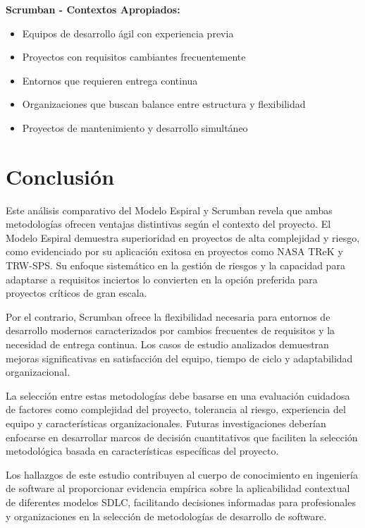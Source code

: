 \documentclass[conference]{IEEEtran}
\begin{document}
\textbf{Scrumban - Contextos Apropiados:}
\begin{itemize}
\item Equipos de desarrollo ágil con experiencia previa \cite{empirical_scrumban_2018}
\item Proyectos con requisitos cambiantes frecuentemente \cite{sixsigma_scrumban}
\item Entornos que requieren entrega continua \cite{atlassian_scrumban}
\item Organizaciones que buscan balance entre estructura y flexibilidad \cite{yilmaz_gamification_2016}
\item Proyectos de mantenimiento y desarrollo simultáneo \cite{scrumbanfall_2020}
\end{itemize}


\section{Conclusión}

Este análisis comparativo del Modelo Espiral y Scrumban revela que ambas metodologías ofrecen ventajas distintivas según el contexto del proyecto. El Modelo Espiral demuestra superioridad en proyectos de alta complejidad y riesgo, como evidenciado por su aplicación exitosa en proyectos como NASA TReK y TRW-SPS. Su enfoque sistemático en la gestión de riesgos y la capacidad para adaptarse a requisitos inciertos lo convierten en la opción preferida para proyectos críticos de gran escala.

Por el contrario, Scrumban ofrece la flexibilidad necesaria para entornos de desarrollo modernos caracterizados por cambios frecuentes de requisitos y la necesidad de entrega continua. Los casos de estudio analizados demuestran mejoras significativas en satisfacción del equipo, tiempo de ciclo y adaptabilidad organizacional.

La selección entre estas metodologías debe basarse en una evaluación cuidadosa de factores como complejidad del proyecto, tolerancia al riesgo, experiencia del equipo y características organizacionales. Futuras investigaciones deberían enfocarse en desarrollar marcos de decisión cuantitativos que faciliten la selección metodológica basada en características específicas del proyecto.

Los hallazgos de este estudio contribuyen al cuerpo de conocimiento en ingeniería de software al proporcionar evidencia empírica sobre la aplicabilidad contextual de diferentes modelos SDLC, facilitando decisiones informadas para profesionales y organizaciones en la selección de metodologías de desarrollo de software.
\end{document}
